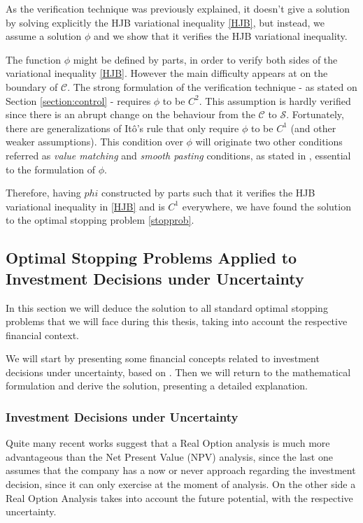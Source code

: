 As the verification technique was previously explained, it doesn't give a solution by solving explicitly the HJB variational inequality \eqref{HJB}, but instead, we assume a solution $\phi$ and we show that it verifies the HJB variational inequality.

The function $\phi$ might be defined by parts, in order to verify both sides of the variational inequality \eqref{HJB}. However the main difficulty appears at on the boundary of $\mathcal{C}$. The strong formulation of the verification technique - as stated on Section \ref{section:control} - requires $\phi$ to be $C^2$. This assumption is hardly verified since there is an abrupt change on the behaviour from the $\mathcal{C}$ to $\mathcal{S}$. Fortunately, there are generalizations of Itô's rule that only require $\phi$ to be $C^1$ (and other weaker assumptions). This condition over $\phi$ will originate two other conditions referred as \textit{value matching} and \textit{smooth pasting} conditions, as stated in \cite{dixit:book}, essential to the formulation of $\phi$.

Therefore, having $phi$ constructed by parts such that it verifies the HJB variational inequality in \eqref{HJB} and is $C^1$ everywhere, we have found the solution to the optimal stopping problem \eqref{stopprob}.





\subsection{Optimal Stopping Problems Applied to Investment Decisions under Uncertainty}

In this section we will deduce the solution to all standard optimal stopping problems that we will face during this thesis, taking into account the respective financial context.

We will start by presenting some financial concepts related to investment decisions under uncertainty, based on \cite{dixit:book}.
Then we will return to the mathematical formulation and derive the solution, presenting a detailed explanation.

\subsubsection{Investment Decisions under Uncertainty}

Quite many recent works suggest that a Real Option analysis is much more advantageous than the Net Present Value (NPV) analysis, since the last one assumes that the company has a now or never approach regarding the investment decision, since it can only exercise at the moment of analysis. On the other side a Real Option Analysis takes into account the future potential, with the respective uncertainty.

